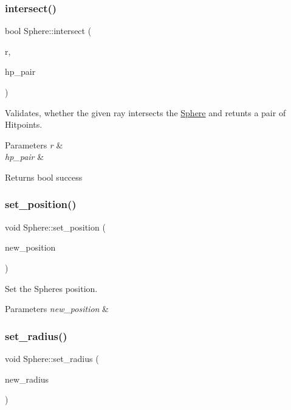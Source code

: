 \subsubsection{\texorpdfstring{intersect()}{intersect()}}
{\footnotesize\ttfamily bool Sphere\+::intersect (\begin{DoxyParamCaption}\item[{\mbox{\hyperlink{struct_ray}{Ray}} const \&}]{r,  }\item[{std\+::pair$<$ \mbox{\hyperlink{struct_hitpoint}{Hitpoint}}, \mbox{\hyperlink{struct_hitpoint}{Hitpoint}} $>$ $\ast$}]{hp\+\_\+pair }\end{DoxyParamCaption})}

Validates, whether the given ray intersects the \mbox{\hyperlink{class_sphere}{Sphere}} and retunts a pair of Hitpoints. 
\begin{DoxyParams}{Parameters}
{\em r} & \\
\hline
{\em hp\+\_\+pair} & \\
\hline
\end{DoxyParams}
\begin{DoxyReturn}{Returns}
bool success 
\end{DoxyReturn}
\mbox{\label{class_sphere_ad050355312225f312b676edc376158e1}} 
\subsubsection{\texorpdfstring{set\+\_\+position()}{set\_position()}}
{\footnotesize\ttfamily void Sphere\+::set\+\_\+position (\begin{DoxyParamCaption}\item[{const Q\+Vector3D \&}]{new\+\_\+position }\end{DoxyParamCaption})}



Set the Spheres position. 


\begin{DoxyParams}{Parameters}
{\em new\+\_\+position} & \\
\hline
\end{DoxyParams}
\mbox{\label{class_sphere_a293cdd84dea67955c6a7d14e86c8d919}} 
\subsubsection{\texorpdfstring{set\+\_\+radius()}{set\_radius()}}
{\footnotesize\ttfamily void Sphere\+::set\+\_\+radius (\begin{DoxyParamCaption}\item[{float}]{new\+\_\+radius }\end{DoxyParamCaption})}



